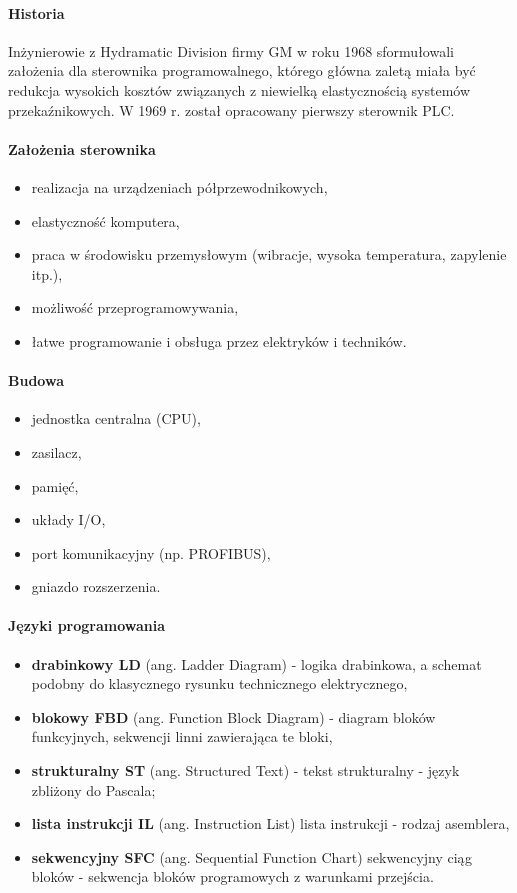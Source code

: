 \documentclass[]{report}
\begin{document}
\paragraph{Historia\\}
Inżynierowie z Hydramatic Division firmy GM w roku 1968 sformułowali założenia dla sterownika programowalnego, którego główna zaletą miała być redukcja wysokich kosztów związanych z niewielką elastycznością systemów przekaźnikowych. W 1969 r. został opracowany pierwszy sterownik PLC.

\paragraph{Założenia sterownika}
\begin{itemize}
\item realizacja na urządzeniach półprzewodnikowych,
\item elastyczność komputera,
\item praca w środowisku przemysłowym (wibracje, wysoka temperatura, zapylenie itp.),
\item możliwość przeprogramowywania,
\item łatwe programowanie i obsługa przez elektryków i techników.
\end{itemize}

\paragraph{Budowa}
\begin{itemize}
\item jednostka centralna (CPU),
\item zasilacz,
\item pamięć,
\item układy I/O,
\item port komunikacyjny (np. PROFIBUS),
\item gniazdo rozszerzenia.
\end{itemize}

\paragraph{Języki programowania}
\begin{itemize}
\item \textbf{drabinkowy LD} (ang. Ladder Diagram) - logika drabinkowa, a schemat podobny do klasycznego rysunku technicznego elektrycznego,
\item \textbf{blokowy FBD} (ang. Function Block Diagram) - diagram bloków funkcyjnych, sekwencji linni zawierająca te bloki,
\item \textbf{strukturalny ST} (ang. Structured Text) - tekst strukturalny - język zbliżony do Pascala;
\item \textbf{lista instrukcji IL} (ang. Instruction List) lista instrukcji - rodzaj asemblera,
\item \textbf{sekwencyjny SFC} (ang. Sequential Function Chart) sekwencyjny ciąg bloków - sekwencja bloków programowych z warunkami przejścia.
\end{itemize}
\end{document}

